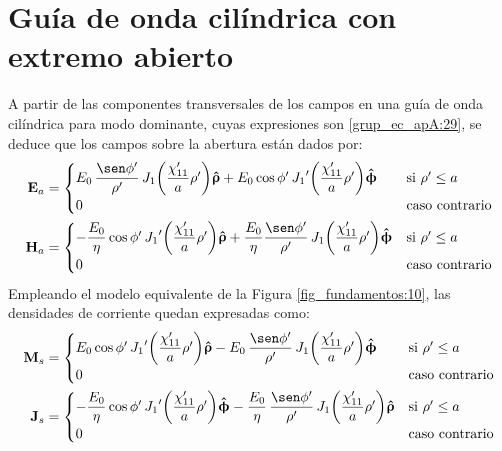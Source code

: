 \section{Guía de onda cilíndrica con extremo abierto}
\label{subsec_apendice_c_guia_cili}

A partir de las componentes transversales de los campos en una guía de onda cilíndrica para modo dominante, cuyas expresiones son \eqref{grup_ec_apA:29}, se deduce que los campos sobre la abertura están dados por:
\begin{align}
\mathbf{E}_a &= 
\begin{cases} 
\makebox[0pt][l]{$E_0\,\dfrac{\sen\phi '}{\rho '}\,J_1\!\left(\dfrac{\chi '_{11}}{a}\rho '\right)\!\versor{\uprho} + E_0\cos\phi '\,{J_1}'\!\left(\dfrac{\chi '_{11}}{a}\rho '\right)\!\versor{\upphi}$}\hphantom{- \dfrac{E_0}{\eta}\cos\phi '\,{J_1}'\!\left(\dfrac{\chi '_{11}}{a}\rho '\right)\!\versor{\uprho} + \dfrac{E_0}{\eta}\dfrac{\sen\phi '}{\rho '}\,J_1\!\left(\dfrac{\chi '_{11}}{a}\rho '\right)\!\versor{\upphi}} &\text{si } \rho '\leq a\\
0 &\text{caso contrario}
\end{cases}
\label{ec_apC:69}\\
\mathbf{H}_a &= 
\begin{cases} 
- \dfrac{E_0}{\eta}\cos\phi '\,{J_1}'\!\left(\dfrac{\chi '_{11}}{a}\rho '\right)\!\versor{\uprho} + \dfrac{E_0}{\eta}\dfrac{\sen\phi '}{\rho '}\,J_1\!\left(\dfrac{\chi '_{11}}{a}\rho '\right)\!\versor{\upphi} &\text{si } \rho '\leq a\\
0  &\text{caso contrario}
\end{cases}
\label{ec_apC:70}
\end{align}
Empleando el modelo equivalente de la Figura \ref{fig_fundamentos:10}, las densidades de corriente quedan expresadas como:
\begin{align}
\mathbf{M}_s &=
\begin{cases}
\makebox[0pt][l]{$E_0\cos\phi '\,{J_1}'\!\left(\dfrac{\chi '_{11}}{a}\rho '\right)\!\versor{\uprho} - E_0\,\dfrac{\sen\phi '}{\rho '}\,J_1\!\left(\dfrac{\chi '_{11}}{a}\rho '\right)\!\versor{\upphi}$}\hphantom{- \dfrac{E_0}{\eta}\cos\phi '\,{J_1}'\!\left(\dfrac{\chi '_{11}}{a}\rho '\right)\!\versor{\upphi} - \dfrac{E_0}{\eta}\,\dfrac{\sen\phi '}{\rho '}\,J_1\!\left(\dfrac{\chi '_{11}}{a}\rho '\right)\!\versor{\uprho}} &\text{si } \rho '\leq a\\
0 &\text{caso contrario}
\end{cases}
\label{ec_apC:71}\\
\mathbf{J}_s &= 
\begin{cases} 
- \dfrac{E_0}{\eta}\cos\phi '\,{J_1}'\!\left(\dfrac{\chi '_{11}}{a}\rho '\right)\!\versor{\upphi} - \dfrac{E_0}{\eta}\,\dfrac{\sen\phi '}{\rho '}\,J_1\!\left(\dfrac{\chi '_{11}}{a}\rho '\right)\!\versor{\uprho} &\text{si } \rho '\leq a\\
0  &\text{caso contrario}
\end{cases}
\label{ec_apC:72}
\end{align}
